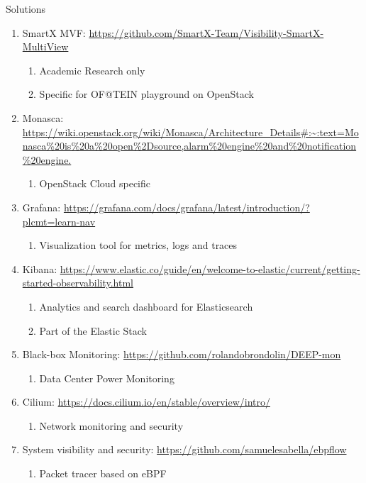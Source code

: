 Solutions
\begin{enumerate}
    \item SmartX MVF: \url{https://github.com/SmartX-Team/Visibility-SmartX-MultiView}
    \begin{enumerate}
        \item Academic Research only
        \item Specific for OF@TEIN playground on OpenStack
    \end{enumerate}
    \item Monasca: \url{https://wiki.openstack.org/wiki/Monasca/Architecture_Details#:~:text=Monasca%20is%20a%20open%2Dsource,alarm%20engine%20and%20notification%20engine.}
    \begin{enumerate}
        \item OpenStack Cloud specific
    \end{enumerate}
    \item Grafana: \url{https://grafana.com/docs/grafana/latest/introduction/?plcmt=learn-nav}
    \begin{enumerate}
        \item Visualization tool for metrics, logs and traces
    \end{enumerate}
    \item Kibana: \url{https://www.elastic.co/guide/en/welcome-to-elastic/current/getting-started-observability.html}
    \begin{enumerate}
        \item Analytics and search dashboard for Elasticsearch
        \item Part of the Elastic Stack
    \end{enumerate}
    \item Black-box Monitoring: \url{https://github.com/rolandobrondolin/DEEP-mon}
    \begin{enumerate}
        \item Data Center Power Monitoring
    \end{enumerate}
    \item Cilium: \url{https://docs.cilium.io/en/stable/overview/intro/}
    \begin{enumerate}
        \item Network monitoring and security
    \end{enumerate}
    \item System visibility and security: \url{https://github.com/samuelesabella/ebpflow}
    \begin{enumerate}
        \item Packet tracer based on eBPF

\end{enumerate}
\end{enumerate}
